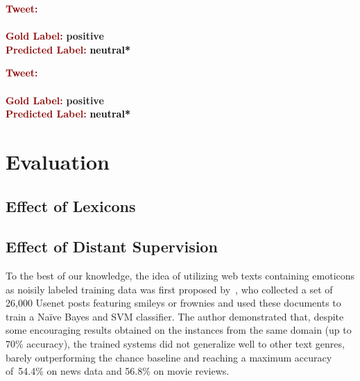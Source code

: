 \begin{example}\label{snt:cgsa:exmp:baziotis-error}
  \noindent\textup{\bfseries\textcolor{darkred}{Tweet:}} {\upshape }\\
  \noindent \\[\exampleSep]
  \noindent\textup{\bfseries\textcolor{darkred}{Gold Label:}}\hspace*{4.3em}\textbf{%
    \upshape\textcolor{green3}{positive}}\\
 \noindent\textup{\bfseries\textcolor{darkred}{Predicted Label:}}\hspace*{2em}\textbf{%
    \upshape\textcolor{black}{neutral*}}
\end{example}

\begin{example}\label{snt:cgsa:exmp:lba-error}
  \noindent\textup{\bfseries\textcolor{darkred}{Tweet:}} {\upshape }\\
  \noindent \\[\exampleSep]
  \noindent\textup{\bfseries\textcolor{darkred}{Gold Label:}}\hspace*{4.3em}\textbf{%
    \upshape\textcolor{green3}{positive}}\\
 \noindent\textup{\bfseries\textcolor{darkred}{Predicted Label:}}\hspace*{2em}\textbf{%
    \upshape\textcolor{black}{neutral*}}
\end{example}

\section{Evaluation}
\subsection{Effect of Lexicons}\label{cgsa:subsec:eval:lexicons}


\subsection{Effect of Distant Supervision}
\todo[inline]{}

To the best of our knowledge, the idea of utilizing web texts
containing emoticons as noisily labeled training data was first
proposed by~\citet{Read:05}, who collected a set of 26,000 Usenet
posts featuring smileys or frownies and used these documents to train
a Na{\"i}ve Bayes and SVM classifier.  The author demonstrated that,
despite some encouraging results obtained on the instances from the
same domain (up to 70\% accuracy), the trained systems did not
generalize well to other text genres, barely outperforming the chance
baseline and reaching a maximum accuracy of~54.4\% on news data and
56.8\% on movie reviews.

